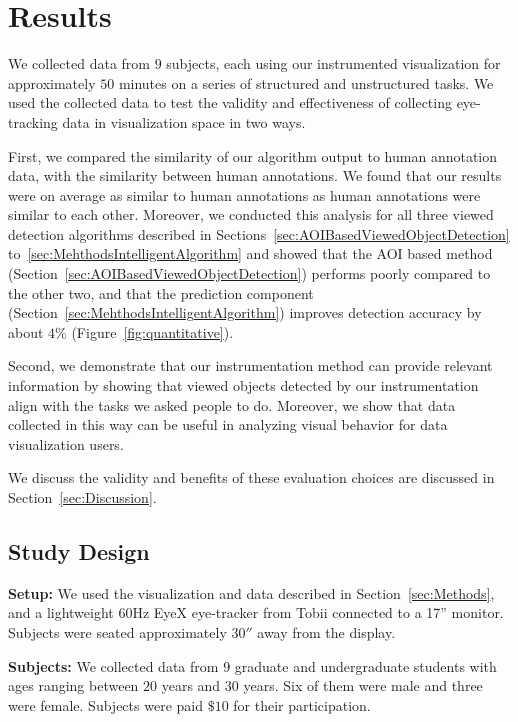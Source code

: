\section{Results}
\label{sec:Evaluation}
We collected data from $9$ subjects, each using our instrumented visualization for approximately $50$ minutes on a series of structured and unstructured tasks. We used the collected data to test the validity and effectiveness of collecting eye-tracking data in visualization space in two ways. 

First, we compared the similarity of our algorithm output to human annotation data, with the similarity between human annotations. We found that our results were on average as similar to human annotations as human annotations were similar to each other. Moreover, we conducted this analysis for all three viewed detection algorithms described in Sections~\ref{sec:AOIBasedViewedObjectDetection} to~\ref{sec:MehthodsIntelligentAlgorithm} and showed that the AOI based method (Section~\ref{sec:AOIBasedViewedObjectDetection}) performs poorly compared to the other two, and that the prediction component (Section~\ref{sec:MehthodsIntelligentAlgorithm}) improves detection accuracy by about $4\%$  (Figure~\ref{fig:quantitative}). 

Second, we demonstrate that our instrumentation method can provide relevant information by showing that viewed objects detected by our instrumentation align with the tasks we asked people to do. Moreover, we show that data collected in this way can be useful in analyzing visual behavior for data visualization users.  

We discuss the validity and benefits of these evaluation choices are discussed in Section~\ref{sec:Discussion}.

\subsection{Study Design }
\label{sec:EvalStudyDesign}

\textbf{Setup: } We used the visualization and data described in Section~\ref{sec:Methods}, and a lightweight $60$Hz EyeX eye-tracker from Tobii connected to a 17'' monitor. Subjects were seated approximately $30''$ away from the display. 

\textbf{Subjects:} We collected data from $9$ graduate and undergraduate students with ages ranging between $20$ years and $30$ years. Six of them were male and three were female. Subjects were paid $\$10$ for their participation. 

